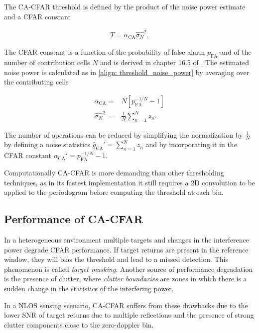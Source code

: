 
The CA-CFAR threshold is defined by the product of the noise power estimate and a CFAR constant

\begin{align}
	T = \alpha_{\text{CA}} \hat{\sigma_N}^2.
\end{align}

The CFAR constant is a function of the probability of false alarm $p_{\text{FA}}$ and of the number of contribution cells $N$ and is derived in chapter 16.5 of \cite{Richards_Scheer_Holm_2010}. The estimated noise power is calculated as in \ref{align: threshold_noise_power} by averaging over the contributing cells

\begin{align}
	\alpha_{\text{CA}} =& N[p_{\text{FA}}^{-1/N} - 1] \\
	\hat{\sigma_N}^2 =& \frac{1}{N}\sum_{n=1}^N z_n.
\end{align}

The number of operations can be reduced by simplifying the normalization by $\frac{1}{N}$ by defining a noise statistics $\hat{g}_{\text{CA}}' = \sum_{n=1}^N z_n$ and by incorporating it in the CFAR constant $\alpha_{\text{CA}}' = p_{\text{FA}}^{-1/N} - 1$.

Computationally CA-CFAR is more demanding than other thresholding techniques, as in its fastest implementation it still requires a 2D convolution to be applied to the periodogram before computing the threshold at each bin.

\subsection{Performance of CA-CFAR}

In a heterogeneous environment multiple targets and changes in the interference power degrade CFAR performance. If target returns are present in the reference window, they will bias the threshold and lead to a missed detection. This phenomenon is called \textit{target masking}. Another source of performance degradation is the presence of clutter, where \textit{clutter boundaries} are zones in which there is a sudden change in the statistics of the interfering power.

In a NLOS sensing scenario, CA-CFAR suffers from these drawbacks due to the lower SNR of target returns due to multiple reflections and the presence of strong clutter components close to the zero-doppler bin.

